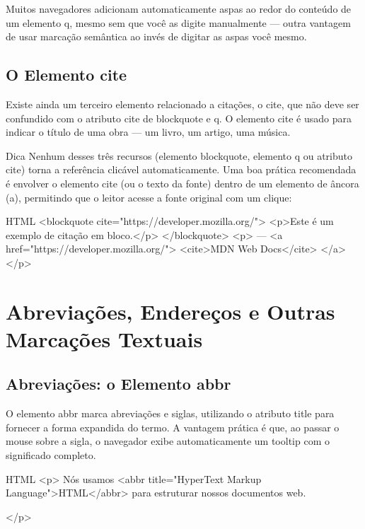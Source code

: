 Muitos navegadores adicionam automaticamente aspas ao redor do conteúdo de um elemento q, mesmo sem que você as digite manualmente — outra vantagem de usar marcação semântica ao invés de digitar as aspas você mesmo.

\subsection{O Elemento cite}

Existe ainda um terceiro elemento relacionado a citações, o cite, que não deve ser confundido com o atributo cite de blockquote e q. O elemento cite é usado para indicar o título de uma obra — um livro, um artigo, uma música.

\begin{infobox}{Dica}
Nenhum desses três recursos (elemento blockquote, elemento q ou atributo cite) torna a referência clicável automaticamente. Uma boa prática recomendada é envolver o elemento cite (ou o texto da fonte) dentro de um elemento de âncora (a), permitindo que o leitor acesse a fonte original com um clique:
\end{infobox}

\begin{codebox}{HTML}
<blockquote cite="https://developer.mozilla.org/">
  <p>Este é um exemplo de citação em bloco.</p>
</blockquote>
<p>
  — <a href="https://developer.mozilla.org/">
      <cite>MDN Web Docs</cite>
    </a>
</p>
\end{codebox}

\section{Abreviações, Endereços e Outras Marcações Textuais}

\subsection{Abreviações: o Elemento abbr}

O elemento abbr marca abreviações e siglas, utilizando o atributo title para fornecer a forma expandida do termo. A vantagem prática é que, ao passar o mouse sobre a sigla, o navegador exibe automaticamente um tooltip com o significado completo.

\begin{codebox}{HTML}
<p>
  Nós usamos <abbr title="HyperText Markup Language">HTML</abbr>
  para estruturar nossos documentos web.



 </p>
\end{codebox}

